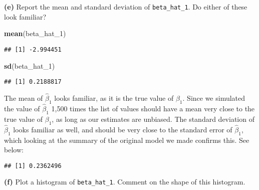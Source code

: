 \documentclass[]{article}
\newenvironment{Shaded}{\begin{snugshade}}{\end{snugshade}}
\newcommand{\KeywordTok}[1]{\textcolor[rgb]{0.13,0.29,0.53}{\textbf{#1}}}
\newcommand{\DecValTok}[1]{\textcolor[rgb]{0.00,0.00,0.81}{#1}}
\newcommand{\OperatorTok}[1]{\textcolor[rgb]{0.81,0.36,0.00}{\textbf{#1}}}
\newcommand{\NormalTok}[1]{#1}
\begin{document}
\textbf{(e)} Report the mean and standard deviation of
\texttt{beta\_hat\_1}. Do either of these look familiar?

\begin{Shaded}
\begin{Highlighting}[]
\KeywordTok{mean}\NormalTok{(beta_hat_}\DecValTok{1}\NormalTok{)}
\end{Highlighting}
\end{Shaded}

\begin{verbatim}
## [1] -2.994451
\end{verbatim}

\begin{Shaded}
\begin{Highlighting}[]
\KeywordTok{sd}\NormalTok{(beta_hat_}\DecValTok{1}\NormalTok{)}
\end{Highlighting}
\end{Shaded}

\begin{verbatim}
## [1] 0.2188817
\end{verbatim}

The mean of \(\hat{\beta}_1\) looks familiar, as it is the true value of
\(\beta_1\). Since we simulated the value of \(\hat{\beta}_1\) 1,500
times the list of values should have a mean very close to the true value
of \(\beta_1\), as long as our estimates are unbiased. The standard
deviation of \(\hat{\beta}_1\) looks familiar as well, and should be
very close to the standard error of \(\hat{\beta}_1\), which looking at
the summary of the original model we made confirms this. See below:

\begin{Shaded}
\end{Shaded}

\begin{verbatim}
## [1] 0.2362496
\end{verbatim}

\textbf{(f)} Plot a histogram of \texttt{beta\_hat\_1}. Comment on the
shape of this histogram.
\end{document}
